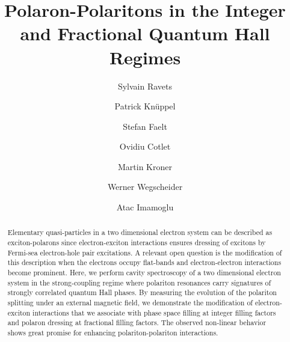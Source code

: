 \documentclass[prl,twocolumn,10pt,showpacs,superscriptaddress,longbibliography,footnoteinbib]{revtex4-1}
\begin{document}
\title{Polaron-Polaritons in the Integer and Fractional Quantum Hall Regimes}

\author{Sylvain Ravets}

\author{Patrick Kn\"uppel}

\author{Stefan Faelt}

\author{Ovidiu Cotlet}

\author{Martin Kroner}

\author{Werner Wegscheider}

\author{Atac Imamoglu}

\begin{abstract}
Elementary quasi-particles in a two dimensional electron system can be described as exciton-polarons since electron-exciton interactions ensures dressing of excitons by Fermi-sea electron-hole pair excitations. A relevant open question is the modification of this description when the electrons occupy flat-bands and electron-electron interactions become prominent. Here, we perform cavity spectroscopy of a two dimensional electron system in the strong-coupling regime where polariton resonances carry signatures of strongly correlated quantum Hall phases. By measuring the evolution of the polariton splitting under an external magnetic field, we demonstrate the modification of electron-exciton interactions that we associate with phase space filling at integer filling factors and polaron dressing at fractional filling factors. The observed non-linear behavior shows great promise for enhancing polariton-polariton interactions.

\end{abstract}
\end{document}

